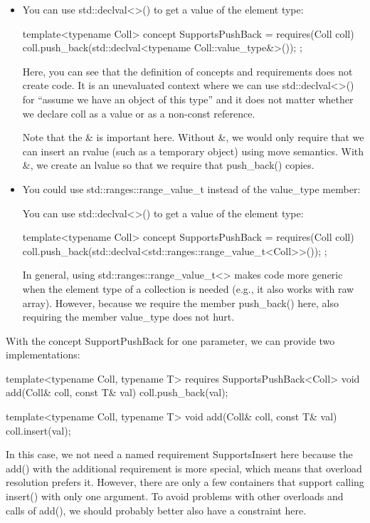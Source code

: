 \begin{itemize}
\item
You can use std::declval<>() to get a value of the element type:

\begin{cpp}
template<typename Coll>
concept SupportsPushBack = requires(Coll coll) {
	coll.push_back(std::declval<typename Coll::value_type&>());
};
\end{cpp}

Here, you can see that the definition of concepts and requirements does not create code. It is an unevaluated context where we can use std::declval<>() for “assume we have an object of this type” and it does not matter whether we declare coll as a value or as a non-const reference.

Note that the \& is important here. Without \&, we would only require that we can insert an rvalue (such as a temporary object) using move semantics. With \&, we create an lvalue so that we require that push\_back() copies.

\item
You could use std::ranges::range\_value\_t instead of the value\_type member:

You can use std::declval<>() to get a value of the element type:

\begin{cpp}
template<typename Coll>
concept SupportsPushBack = requires(Coll coll) {
	coll.push_back(std::declval<std::ranges::range_value_t<Coll>>());
};
\end{cpp}

In general, using std::ranges::range\_value\_t<> makes code more generic when the element type of a collection is needed (e.g., it also works with raw array). However, because we require the member push\_back() here, also requiring the member value\_type does not hurt.

\end{itemize}

With the concept SupportPushBack for one parameter, we can provide two implementations:

\begin{cpp}
template<typename Coll, typename T>
requires SupportsPushBack<Coll>
void add(Coll& coll, const T& val)
{
	coll.push_back(val);
}

template<typename Coll, typename T>
void add(Coll& coll, const T& val)
{
	coll.insert(val);
}
\end{cpp}

In this case, we not need a named requirement SupportsInsert here because the add() with the additional requirement is more special, which means that overload resolution prefers it. However, there are only a few containers that support calling insert() with only one argument. To avoid problems with other overloads and calls of add(), we should probably better also have a constraint here.

